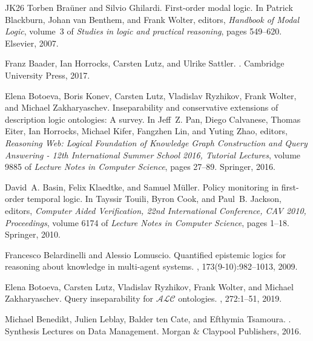 \documentclass[10pt,a4paper]{amsart}
\theoremstyle{plain}
\theoremstyle{definition}
\begin{document}
\begin{thebibliography}{{}JK{\etalchar{+}}26}
Torben Bra{\"{u}}ner and Silvio Ghilardi.
\newblock First-order modal logic.
\newblock In Patrick Blackburn, Johan van Benthem, and Frank Wolter, editors, {\em Handbook of Modal Logic}, volume~3 of {\em Studies in logic and practical reasoning}, pages 549--620. Elsevier, 2007.

Franz Baader, Ian Horrocks, Carsten Lutz, and Ulrike Sattler.
.
\newblock Cambridge University Press, 2017.

Elena Botoeva, Boris Konev, Carsten Lutz, Vladislav Ryzhikov, Frank Wolter, and Michael Zakharyaschev.
\newblock Inseparability and conservative extensions of description logic ontologies: {A} survey.
\newblock In Jeff~Z. Pan, Diego Calvanese, Thomas Eiter, Ian Horrocks, Michael Kifer, Fangzhen Lin, and Yuting Zhao, editors, {\em Reasoning Web: Logical Foundation of Knowledge Graph Construction and Query Answering - 12th International Summer School 2016, Tutorial Lectures}, volume 9885 of {\em Lecture Notes in Computer Science}, pages 27--89. Springer, 2016.

David~A. Basin, Felix Klaedtke, and Samuel M{\"{u}}ller.
\newblock Policy monitoring in first-order temporal logic.
\newblock In Tayssir Touili, Byron Cook, and Paul~B. Jackson, editors, {\em Computer Aided Verification, 22nd International Conference, {CAV} 2010, Proceedings}, volume 6174 of {\em Lecture Notes in Computer Science}, pages 1--18. Springer, 2010.

Francesco Belardinelli and Alessio Lomuscio.
\newblock Quantified epistemic logics for reasoning about knowledge in multi-agent systems.
, 173(9-10):982--1013, 2009.

Elena Botoeva, Carsten Lutz, Vladislav Ryzhikov, Frank Wolter, and Michael Zakharyaschev.
\newblock Query inseparability for {$\mathcal{ALC}$} ontologies.
, 272:1--51, 2019.

Michael Benedikt, Julien Leblay, Balder ten Cate, and Efthymia Tsamoura.
.
\newblock Synthesis Lectures on Data Management. Morgan {\&} Claypool Publishers, 2016.


\end{thebibliography}
\end{document}
